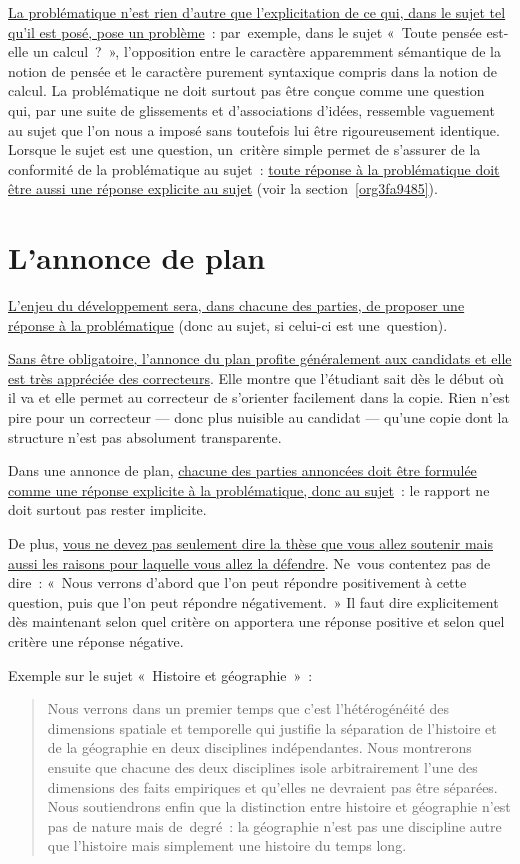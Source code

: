 \documentclass[a4paper,12pt]{report}
\begin{document}
\uline{La problématique n'est rien d'autre que l'explicitation de ce qui, dans
le sujet tel qu'il est posé, pose un problème} : par exemple, dans le
sujet « Toute pensée est-elle un calcul ? », l'opposition entre le
caractère apparemment sémantique de la notion de pensée et le caractère
purement syntaxique compris dans la notion de calcul. La problématique
ne doit surtout pas être conçue comme une question qui, par une suite de
glissements et d'associations d'idées, ressemble vaguement au sujet que
l'on nous a imposé sans toutefois lui être rigoureusement identique.
Lorsque le sujet est une question, un critère simple permet de s'assurer
de la conformité de la problématique au sujet : \uline{toute réponse à la
problématique doit être aussi une réponse explicite au sujet} (voir la
section \ref{org3fa9485}).



\section{L'annonce de plan}
\label{sec:orge41bdd3}
\label{org0a4bd99}

\uline{L'enjeu du développement sera, dans chacune des parties, de proposer
une réponse à la problématique} (donc au sujet, si celui-ci est
une question).

\uline{Sans être obligatoire, l'annonce du plan profite généralement aux
candidats et elle est très appréciée des correcteurs}. Elle montre que
l'étudiant sait dès le début où il va et elle permet au correcteur de
s'orienter facilement dans la copie. Rien n'est pire pour un correcteur
— donc plus nuisible au candidat — qu'une copie dont la structure n'est
pas absolument transparente.

Dans une annonce de plan, \uline{chacune des parties annoncées doit être
formulée comme une réponse explicite à la problématique, donc au
sujet} : le rapport ne doit surtout pas rester implicite. 

De plus, \uline{vous ne devez pas seulement dire la thèse que vous allez
soutenir mais aussi les raisons pour laquelle vous allez la défendre}.
Ne vous contentez pas de dire : « Nous verrons d'abord que l'on peut
répondre positivement à cette question, puis que l'on peut répondre
négativement. » Il faut dire explicitement dès maintenant selon quel
critère on apportera une réponse positive et selon quel critère une
réponse négative. 

Exemple sur le sujet « Histoire et géographie » : 
\begin{quotation}
Nous verrons dans un premier temps que c'est l'hétérogénéité des
dimensions spatiale et temporelle qui justifie la séparation de
l'histoire et de la géographie en deux disciplines indépendantes. Nous
montrerons ensuite que chacune des deux disciplines isole arbitrairement
l'une des dimensions des faits empiriques et qu'elles ne devraient pas
être séparées. Nous soutiendrons enfin que la distinction entre histoire
et géographie n'est pas de nature mais de degré : la géographie n'est
pas une discipline autre que l'histoire mais simplement une histoire du
temps long.
\end{quotation}
\end{document}
